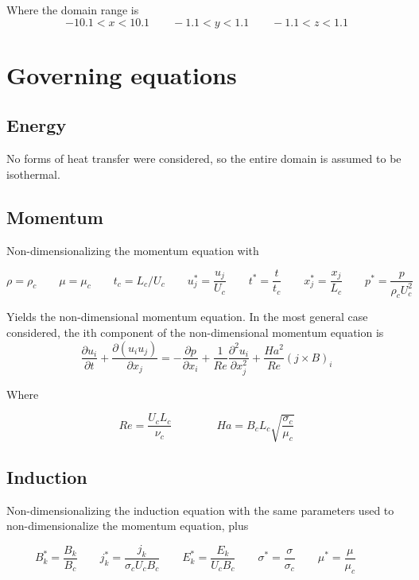 \documentclass[11pt]{article}
\begin{document}
Where the domain range is
\begin{equation}
	-10.1 < x < 10.1 \qquad -1.1 < y < 1.1 \qquad -1.1 < z < 1.1
\end{equation}

\section{Governing equations}

\subsection{Energy}
No forms of heat transfer were considered, so the entire domain is assumed to be isothermal.

\subsection{Momentum}
Non-dimensionalizing the momentum equation with

\begin{equation}
	\rho = \rho_c \qquad
	\mu = \mu_c \qquad
	t_c = L_c/U_c \qquad
	u_j^* = \frac{u_j}{U_c} \qquad
	t^* = \frac{t}{t_c} \qquad
	x_j^* = \frac{x_j}{L_c} \qquad
	p^* = \frac{p}{\rho_c U_c^2} \qquad
\end{equation}

Yields the non-dimensional momentum equation. In the most general case considered, the ith component of the non-dimensional momentum equation is
\begin{equation}
	\frac{\partial u_i}{\partial t} +
	\frac{\partial (u_i u_j)}{\partial x_j}
	=
	- \frac{\partial p}{\partial x_i}
	+ \frac{1}{Re}
	\frac{\partial^2 u_i}{\partial x_j^2}
	+ \frac{Ha^2}{Re}
	(j \times B)_i
\end{equation}

Where

\begin{equation}
	Re = \frac{U_c L_c}{\nu_c}
	\qquad \qquad
	Ha = B_c L_c \sqrt{\frac{\sigma_c}{\mu_c}}
\end{equation}

\subsection{Induction}
Non-dimensionalizing the induction equation with the same parameters used to non-dimensionalize the momentum equation, plus

\begin{equation}
	B_k^* = \frac{B_k}{B_c}  \qquad
	j_k^* = \frac{j_k}{\sigma_c U_c B_c} \qquad
	E_k^* = \frac{E_k}{U_c B_c} \qquad
	\sigma^* = \frac{\sigma}{\sigma_c} \qquad
	\mu^* = \frac{\mu}{\mu_c} \qquad
\end{equation}
\end{document}
